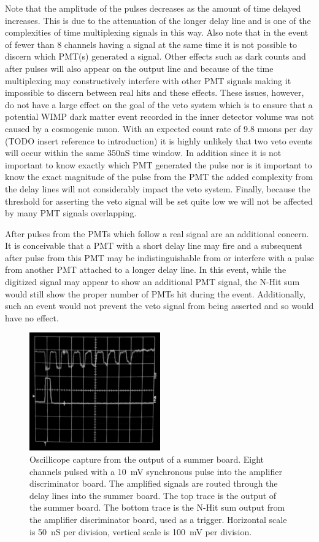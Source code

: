 \documentclass[review,number,sort&compress]{elsarticle}
\begin{document}
Note that the amplitude of the pulses decreases as the amount of time delayed
increases.  This is due to the attenuation of the longer delay line and is
one of the complexities of time multiplexing signals in this way. Also note
that in the event of fewer than 8 channels having a signal at the same time
it is not possible to discern which PMT(s) generated a signal. Other effects
such as dark counts and after pulses will also appear on the output line and
because of the time multiplexing may constructively interfere with other PMT
signals making it impossible to discern between real hits and these effects.
These issues, however, do not have a large effect on the goal of the veto system which is to
ensure that a potential WIMP dark matter event recorded in the inner detector
volume was not caused by a cosmogenic muon. With an expected count rate of
9.8 muons per day (TODO insert reference to introduction) it is highly unlikely that two veto events will occur
within the same 350nS time window. In addition since it is not important to
know exactly which PMT generated the pulse nor is it important to know
the exact magnitude of the pulse from the PMT the added complexity from the
delay lines will not considerably impact the veto system. Finally, because
the threshold for asserting the veto signal will be set quite low we will
not be affected by many PMT signals overlapping.

After pulses from the PMTs which follow a real signal are an additional
concern. It is conceivable that a PMT with a short delay line may fire and
a subsequent after pulse from this PMT may be indistinguishable from or
interfere with a pulse from another PMT attached to a longer delay line. In
this event, while the digitized signal may appear to show an additional PMT
signal, the N-Hit sum would still show the proper number of PMTs hit during
the event. Additionally, such an event would not prevent the veto signal
from being asserted and so would have no effect.

\begin{figure}[ht]
\begin{center}
	\includegraphics[height=2in, keepaspectratio=true]{graphics/delaypulse_bw.jpg}
	\caption{Oscillicope capture from the output of a summer board. Eight channels
		pulsed with a 10~mV synchronous pulse into the amplifier discriminator board. The amplified
		signals are routed through the delay lines into the summer board. The top trace is
		the output of the summer board. The bottom trace is the N-Hit sum output from the
		amplifier discriminator board, used as a trigger. Horizontal scale is 50~nS per division,
		vertical scale is 100~mV per division.
\label{fig:multipulse}}
\end{center}
\end{figure}
\end{document}
